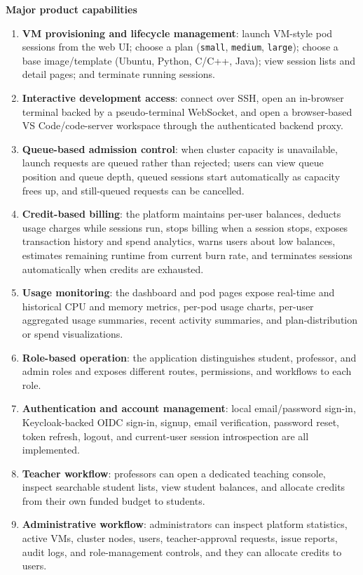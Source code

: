 \documentclass[12pt,a4paper]{article}
\begin{document}
\textbf{Major product capabilities}
\begin{enumerate}[leftmargin=*,label=\arabic*.]
    \item \textbf{VM provisioning and lifecycle management}: launch VM-style pod sessions from the web UI; choose a plan (\texttt{small}, \texttt{medium}, \texttt{large}); choose a base image/template (Ubuntu, Python, C/C++, Java); view session lists and detail pages; and terminate running sessions.
    \item \textbf{Interactive development access}: connect over SSH, open an in-browser terminal backed by a pseudo-terminal WebSocket, and open a browser-based VS Code/code-server workspace through the authenticated backend proxy.
    \item \textbf{Queue-based admission control}: when cluster capacity is unavailable, launch requests are queued rather than rejected; users can view queue position and queue depth, queued sessions start automatically as capacity frees up, and still-queued requests can be cancelled.
    \item \textbf{Credit-based billing}: the platform maintains per-user balances, deducts usage charges while sessions run, stops billing when a session stops, exposes transaction history and spend analytics, warns users about low balances, estimates remaining runtime from current burn rate, and terminates sessions automatically when credits are exhausted.
    \item \textbf{Usage monitoring}: the dashboard and pod pages expose real-time and historical CPU and memory metrics, per-pod usage charts, per-user aggregated usage summaries, recent activity summaries, and plan-distribution or spend visualizations.
    \item \textbf{Role-based operation}: the application distinguishes student, professor, and admin roles and exposes different routes, permissions, and workflows to each role.
    \item \textbf{Authentication and account management}: local email/password sign-in, Keycloak-backed OIDC sign-in, signup, email verification, password reset, token refresh, logout, and current-user session introspection are all implemented.
    \item \textbf{Teacher workflow}: professors can open a dedicated teaching console, inspect searchable student lists, view student balances, and allocate credits from their own funded budget to students.
    \item \textbf{Administrative workflow}: administrators can inspect platform statistics, active VMs, cluster nodes, users, teacher-approval requests, issue reports, audit logs, and role-management controls, and they can allocate credits to users.
\end{enumerate}
\end{document}
